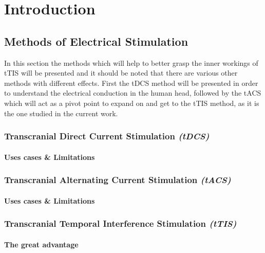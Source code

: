 \pagebreak
{}
\chapter{Introduction}

\section{Methods of Electrical Stimulation}

In this section the methods which will help to better grasp the inner workings of \gls{tTIS} will be presented and it should be noted that there are various other methods with different effects. First the \gls{tDCS} method will be presented in order to understand the electrical conduction in the human head, followed by the \gls{tACS} which will act as a pivot point to expand on and get to the \gls{tTIS} method, as it is the one studied in the current work. 

\subsection{Transcranial Direct Current Stimulation \textit{(tDCS)}}
\cite{Nitsche2008}
\subsubsection{Uses cases \& Limitations}

\subsection{Transcranial Alternating Current Stimulation \textit{(tACS)}}
\subsubsection{Uses cases \& Limitations}

\subsection{Transcranial Temporal Interference Stimulation \textit{(tTIS)}}



\subsubsection{The great advantage}
